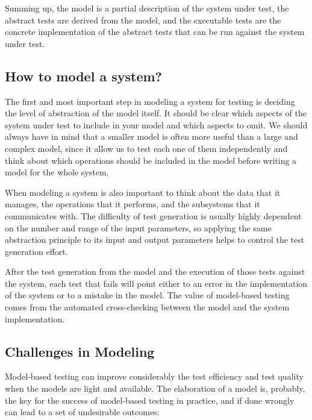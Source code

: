 Summing up, the model is a partial description of the system under test, the abstract tests are derived from the model, and the executable tests are the concrete implementation of the abstract tests that can be run against the system under test.


\subsection{How to model a system?}

The first and most important step in modeling a system for testing is deciding the level of abstraction of the model itself. It should be clear which aspects of the system under test to include in your model and which aspects to omit. We should always have in mind that a smaller model is often more useful than a large and complex model, since it allow us to test each one of them independently and think about which operations should be included in the model before writing a model for the whole system. 

When modeling a system is also important to think about the data that it manages, the operations that it performs, and the subsystems that it communicates with. The difficulty of test generation is usually highly dependent on the number and range of the input parameters, so applying the same abstraction principle to its input and output parameters helps to control the test generation effort.

After the test generation from the model and the execution of those tests against the system, each test that fails will point either to an error in the implementation of the system or to a mistake in the model. The value of model-based testing comes from the automated cross-checking between the model and the system implementation.
 
\subsection{Challenges in Modeling}
Model-based testing can improve considerably the test 
efficiency and test quality when the models are light 
and available. The elaboration of a model is, probably, 
the key for the success of model-based testing in practice,
and if done wrongly~\cite{Peleska.2013} can lead to a set of undesirable 
outcomes:

